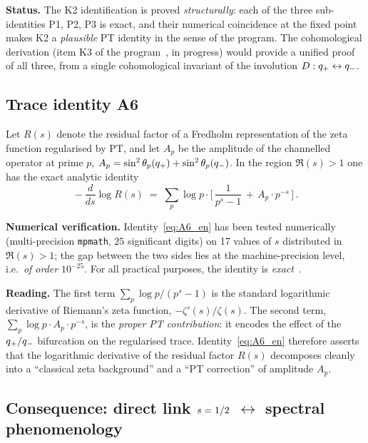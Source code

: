 \textbf{Status.} The K2 identification is proved \emph{structurally}: each of the three sub-identities P1, P2, P3 is exact, and their numerical coincidence at the fixed point makes K2 a \emph{plausible} PT identity in the sense of the program. The cohomological derivation (item K3 of the program~\cite{PT_NewMath_Consolidation}, in progress) would provide a unified proof of all three, from a single cohomological invariant of the involution $D : q_{+} \leftrightarrow q_{-}$.

\subsection{Trace identity A6}
\label{sec:spectrales:A6}

\begin{theoreme}
\label{thm:A6_en}
Let $R(s)$ denote the residual factor of a Fredholm representation of the zeta function regularised by PT, and let $A_p$ be the amplitude of the channelled operator at prime $p$, $A_p = \sin^{2}\theta_{p}(q_{+}) + \sin^{2}\theta_{p}(q_{-})$. In the region $\Re(s) > 1$ one has the exact analytic identity
\begin{equation}
\boxed{\;
-\dfrac{d}{ds} \log R(s) \;=\; \sum_{p} \log p \cdot \biggl[\, \dfrac{1}{p^{s} - 1} \,+\, A_p \cdot p^{-s} \,\biggr] \,. \;}
\label{eq:A6_en}
\end{equation}
\end{theoreme}

\textbf{Numerical verification.} Identity~\eqref{eq:A6_en} has been tested numerically (multi-precision \texttt{mpmath}, $25$ significant digits) on 17 values of $s$ distributed in $\Re(s) > 1$; the gap between the two sides lies at the machine-precision level, i.e.\ \emph{of order} $10^{-25}$. For all practical purposes, the identity is \emph{exact}~\cite[Note 62]{PT_NewMath_Consolidation}.

\textbf{Reading.} The first term $\sum_p \log p / (p^{s} - 1)$ is the standard logarithmic derivative of Riemann's zeta function, $-\zeta'(s)/\zeta(s)$. The second term, $\sum_p \log p \cdot A_p \cdot p^{-s}$, is the \emph{proper PT contribution}: it encodes the effect of the $q_{+} / q_{-}$ bifurcation on the regularised trace. Identity~\eqref{eq:A6_en} therefore asserts that the logarithmic derivative of the residual factor $R(s)$ decomposes cleanly into a ``classical zeta background'' and a ``PT correction'' of amplitude $A_p$.

\subsection{Consequence: direct link \texorpdfstring{$s = 1/2$}{s=1/2} \texorpdfstring{$\leftrightarrow$}{<->} spectral phenomenology}
\label{sec:spectrales:conclusion}

